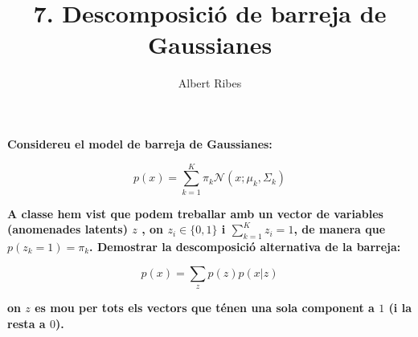 \documentclass[a4paper,10pt]{article}
\title{7. Descomposició de barreja de Gaussianes}
\author{Albert Ribes}
\begin{document}
\maketitle

%


\textbf{
Considereu el model de barreja de Gaussianes:
}

\begin{equation*}
p(x) = \sum_{k = 1}^{K} \pi_k \mathcal{N}(x; \mu_k, \Sigma_k)
\end{equation*}

\textbf{
A classe hem vist que podem treballar amb un vector de variables (anomenades latents) $z$ , on $z_i \in \{0,1\}$
i $\sum_{k = 1}^{K} z_i = 1$, de manera que $p(z_k = 1) = \pi_k$. Demostrar la descomposició alternativa de la barreja:
}

\begin{equation*}
p(x) = \sum_{z} p(z)p(x|z)
\end{equation*}

\textbf{
on $z$ es mou per tots els vectors que ténen una sola component a $1$ (i la resta a $0$).
}
\end{document}
